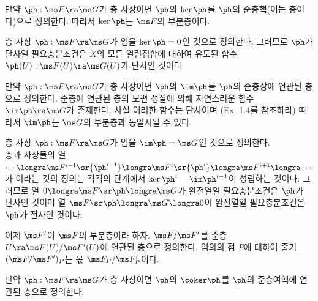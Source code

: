 	
	\begin{definition}
	\end{definition}
	
	만약 $\ph:\ms F\ra\ms G$가 층 사상이면 $\ph$의  $\ker\ph$를 $\ph$의 준층핵(이는 층이다)으로 정의한다.
	따라서 $\ker\ph$는 $\ms F$의 부분층이다.
	
	층 사상 $\ph:\ms F\ra\ms G$가 임을 $\ker\ph=0$인 것으로 정의한다.
	그러므로 $\ph$가 단사일 필요충분조건은 $X$의 모든 열린집합에 대하여 유도된 함수 $\ph(U):\ms F(U)\ra\ms G(U)$가 단사인 것이다.
	
	만약 $\ph:\ms F\ra\ms G$가 층 사상이면 $\ph$의  $\im\ph$를 $\ph$의 준층상에 연관된 층으로 정의한다.
	준층에 연관된 층의 보편 성질에 의해 자연스러운 함수 $\im\ph\ra\ms G$가 존재한다.
	사실 이러한 함수는 단사이며 (Ex. 1.4를 참조하라) 따라서 $\im\ph$는 $\ms G$의 부분층과 동일시될 수 있다.
	
	층 사상 $\ph:\ms F\ra\ms G$가 임을 $\im\ph=\ms G$인 것으로 정의한다.\\
	
	층과 사상들의 열 $\cdots\longra\ms F^{i-1}\sr{\ph^{i-1}}\longra\ms F^i\sr{\ph^i}\longra\ms F^{i+1}\longra\cdots$가
	이라는 것의 정의는 각각의 단계에서 $\ker\ph^i=\im\ph^{i-1}$이 성립하는 것이다.
	그러므로 열 $0\longra\ms F\sr\ph\longra\ms G$가 완전열일 필요충분조건은 $\ph$가 단사인 것이며
	열 $\ms F\sr\ph\longra\ms G\longra 0$이 완전열일 필요충분조건은 $\ph$가 전사인 것이다.
	
	이제 $\ms F'$이 $\ms F$의 부분층이라 하자.  $\ms F/\ms F'$를
	준층 $U\ra\ms F(U)/\ms F'(U)$에 연관된 층으로 정의한다.
	임의의 점 $P$에 대하여 줄기 $(\ms F/\ms F')_P$는 몫 $\ms F_P/\ms F_P'$이다.
	
	만약 $\ph:\ms F\ra\ms G$가 층 사상이면 $\ph$의  $\coker\ph$를 $\ph$의 준층여핵에 연관된 층으로 정의한다.
	
	
	\begin{caution}
	\end{caution}
	
